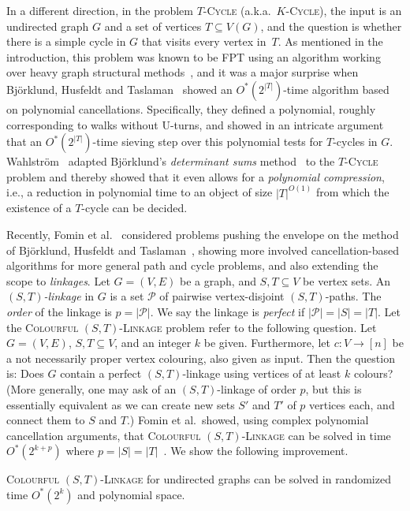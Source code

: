\documentclass{theoretics}
\newcommand{\cP}{\ensuremath{\mathcal P}\xspace}
\begin{document}
In a different direction, in the problem \textsc{$T$-Cycle}
(a.k.a.\ \textsc{$K$-Cycle}), the input is an undirected graph $G$ and
a set of vertices $T \subseteq V(G)$, and the question is whether
there is a simple cycle in $G$ that visits every vertex in~$T$.
As mentioned in the introduction, this problem was known to be FPT
using an algorithm working over heavy graph structural methods~\cite{Kawarabayashi08},
and it was a major surprise when Björklund, Husfeldt and Taslaman~\cite{BjorklundHT12soda}
showed an $O^*(2^{|T|})$-time algorithm based on polynomial cancellations. 
Specifically, they defined a polynomial, roughly corresponding to
walks without U-turns, and showed in an intricate argument 
that an $O^*(2^{|T|})$-time sieving step over this polynomial
tests for $T$-cycles in $G$. 
Wahlström~\cite{Wahlstrom13STACS} adapted Björklund's
\emph{determinant sums} method~\cite{Bjorklund14detsum} to the
\textsc{$T$-Cycle} problem and thereby showed that it even allows for
a \emph{polynomial compression}, i.e., a reduction in polynomial time
to an object of size $|T|^{O(1)}$ from which the existence of a
$T$-cycle can be decided. 

Recently, Fomin et al.~\cite{FominGKSS24} considered problems
pushing the envelope on the method of Björklund, Husfeldt and
Taslaman~\cite{BjorklundHT12soda}, showing more involved 
cancellation-based algorithms for more general path and cycle
problems, and also extending the scope to \emph{linkages}.
Let $G=(V,E)$ be a graph, and $S, T \subseteq V$ be vertex sets.
An \emph{$(S,T)$-linkage} in $G$ is a set $\cP$ of pairwise vertex-disjoint
$(S,T)$-paths. The \emph{order} of the linkage is $p=|\cP|$. 
We say the linkage is \emph{perfect} if $|\cP|=|S|=|T|$.
Let the \textsc{Colourful $(S,T)$-Linkage} problem refer to the
following question. Let $G=(V,E)$, $S, T \subseteq V$, and an integer
$k$ be given. Furthermore, let $c \colon V \to [n]$ be a not
necessarily proper vertex colouring, also given as input.
Then the question is: Does $G$ contain a perfect $(S,T)$-linkage using
vertices of at least $k$ colours? (More generally, one may ask of an
$(S,T)$-linkage of order $p$, but this is essentially equivalent
as we can create new sets $S'$ and $T'$ of $p$ vertices each,
and connect them to $S$ and $T$.)
Fomin et al.\ showed, using complex polynomial
cancellation arguments, that \textsc{Colourful $(S,T)$-Linkage}
can be solved in time $O^*(2^{k+p})$ where $p=|S|=|T|$~\cite{FominGKSS24}.
We show the following improvement.

\begin{theorem}
  \label{thm:k-st-linkage}
  \textsc{Colourful $(S,T)$-Linkage} for undirected graphs can be
  solved in randomized time $O^*(2^k)$ and polynomial space. 
\end{theorem}
\end{document}
